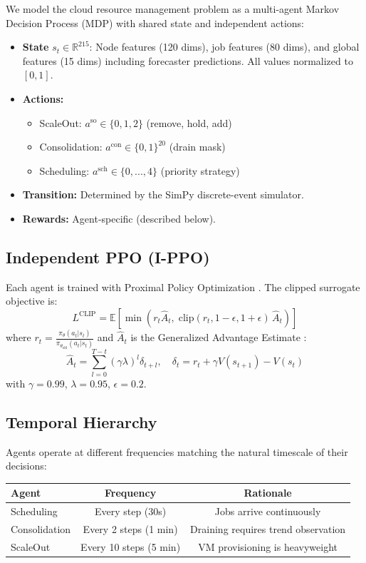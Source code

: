 \documentclass[12pt,a4paper]{article}
\begin{document}
We model the cloud resource management problem as a multi-agent Markov Decision
Process (MDP) with shared state and independent actions:

\begin{itemize}
  \item \textbf{State} $s_t \in \mathbb{R}^{215}$: Node features (120 dims),
        job features (80 dims), and global features (15 dims) including
        forecaster predictions. All values normalized to $[0,1]$.
  \item \textbf{Actions:}
    \begin{itemize}
      \item ScaleOut: $a^{\text{so}} \in \{0, 1, 2\}$ (remove, hold, add)
      \item Consolidation: $a^{\text{con}} \in \{0,1\}^{20}$ (drain mask)
      \item Scheduling: $a^{\text{sch}} \in \{0,...,4\}$ (priority strategy)
    \end{itemize}
  \item \textbf{Transition:} Determined by the SimPy discrete-event simulator.
  \item \textbf{Rewards:} Agent-specific (described below).
\end{itemize}

\subsection{Independent PPO (I-PPO)}

Each agent is trained with Proximal Policy Optimization \cite{schulman2017ppo}.
The clipped surrogate objective is:
\[
  L^{\text{CLIP}} = \mathbb{E}\left[\min\left(
    r_t \hat{A}_t,\;
    \text{clip}(r_t, 1{-}\epsilon, 1{+}\epsilon)\,\hat{A}_t
  \right)\right]
\]
where $r_t = \frac{\pi_\theta(a_t|s_t)}{\pi_{\theta_{\text{old}}}(a_t|s_t)}$
and $\hat{A}_t$ is the Generalized Advantage Estimate \cite{schulman2016gae}:
\[
  \hat{A}_t = \sum_{l=0}^{T-t} (\gamma\lambda)^l \delta_{t+l}, \quad
  \delta_t = r_t + \gamma V(s_{t+1}) - V(s_t)
\]
with $\gamma=0.99$, $\lambda=0.95$, $\epsilon=0.2$.

\subsection{Temporal Hierarchy}

Agents operate at different frequencies matching the natural timescale of their
decisions:

\begin{center}
\begin{tabular}{lcc}
\toprule
\textbf{Agent} & \textbf{Frequency} & \textbf{Rationale} \\
\midrule
Scheduling & Every step (30s) & Jobs arrive continuously \\
Consolidation & Every 2 steps (1 min) & Draining requires trend observation \\
ScaleOut & Every 10 steps (5 min) & VM provisioning is heavyweight \\
\bottomrule
\end{tabular}
\end{center}
\end{document}
